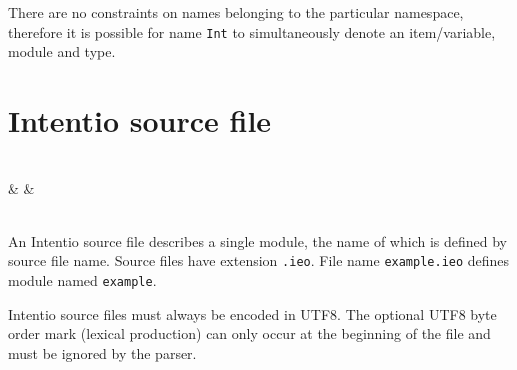 There are no constraints on names belonging to the particular namespace, therefore it is possible for name \texttt{Int} to simultaneously denote an item/variable, module and type.

\section{Intentio source file}

\begin{bnf}
   \eq {} \\
            & &  \\
  \\
   \eq {} 
\end{bnf}

An Intentio source file describes a single module, the name of which is defined by source file name. Source files have extension \lstinline{.ieo}. File name \lstinline{example.ieo} defines module named \lstinline{example}.

\begin{bnfutils}
Intentio source files must always be encoded in UTF8. The optional UTF8 byte order mark (lexical  production) can only occur at the beginning of the file and must be ignored by the parser.
\end{bnfutils}
